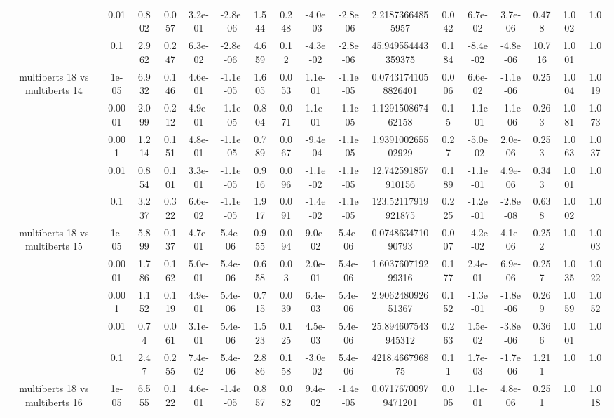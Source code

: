 \begin{tabular}{|c|c|c|c|c|c|c|c|c|c|c|c|c|c|c|c|c|}
 & 0.01 & 0.802 & 0.057 & 3.2e-01 & -2.8e-06 & 1.544 & 0.248 & -4.0e-03 & -2.8e-06 & 2.21873664855957 & 0.042 & 6.7e-02 & 3.7e-06 & 0.478 & 1.002 & 1.0 \\
 & 0.1 & 2.962 & 0.247 & 6.3e-02 & -2.8e-06 & 4.659 & 0.12 & -4.3e-02 & -2.8e-06 & 45.949554443359375 & 0.184 & -8.4e-02 & -4.8e-06 & 10.716 & 1.001 & 1.0 \\
\hline
\multirow{5}{*}{multiberts 18 vs multiberts 14} & 1e-05 & 6.932 & 0.146 & 4.6e-01 & -1.1e-05 & 1.605 & 0.053 & 1.1e-01 & -1.1e-05 & 0.07431741058826401 & 0.006 & 6.6e-02 & -1.1e-06 & 0.25 & 1.004 & 1.019 \\
 & 0.0001 & 2.099 & 0.212 & 4.9e-01 & -1.1e-05 & 0.804 & 0.071 & 1.1e-01 & -1.1e-05 & 1.129150867462158 & 0.15 & -1.1e-01 & -1.1e-06 & 0.263 & 1.081 & 1.073 \\
 & 0.001 & 1.214 & 0.151 & 4.8e-01 & -1.1e-05 & 0.789 & 0.067 & -9.4e-04 & -1.1e-05 & 1.939100265502929 & 0.27 & -5.0e-02 & 2.0e-06 & 0.253 & 1.063 & 1.037 \\
 & 0.01 & 0.854 & 0.101 & 3.3e-01 & -1.1e-05 & 0.916 & 0.096 & -1.1e-02 & -1.1e-05 & 12.742591857910156 & 0.189 & -1.1e-01 & 4.9e-06 & 0.343 & 1.001 & 1.0 \\
 & 0.1 & 3.237 & 0.322 & 6.6e-02 & -1.1e-05 & 1.917 & 0.091 & -1.4e-02 & -1.1e-05 & 123.52117919921875 & 0.225 & -1.2e-01 & -2.8e-08 & 0.638 & 1.002 & 1.0 \\
\hline
\multirow{5}{*}{multiberts 18 vs multiberts 15} & 1e-05 & 5.899 & 0.137 & 4.7e-01 & 5.4e-06 & 0.955 & 0.094 & 9.0e-02 & 5.4e-06 & 0.074863471090793 & 0.007 & -4.2e-02 & 4.1e-06 & 0.252 & 1.0 & 1.003 \\
 & 0.0001 & 1.786 & 0.162 & 5.0e-01 & 5.4e-06 & 0.658 & 0.03 & 2.0e-01 & 5.4e-06 & 1.603760719299316 & 0.177 & 2.4e-01 & 6.9e-06 & 0.257 & 1.035 & 1.022 \\
 & 0.001 & 1.152 & 0.119 & 4.9e-01 & 5.4e-06 & 0.715 & 0.039 & 6.4e-03 & 5.4e-06 & 2.906248092651367 & 0.152 & -1.3e-01 & -1.8e-06 & 0.269 & 1.059 & 1.052 \\
 & 0.01 & 0.74 & 0.061 & 3.1e-01 & 5.4e-06 & 1.523 & 0.125 & 4.5e-03 & 5.4e-06 & 25.894607543945312 & 0.263 & 1.5e-02 & -3.8e-06 & 0.366 & 1.001 & 1.0 \\
 & 0.1 & 2.47 & 0.255 & 7.4e-02 & 5.4e-06 & 2.886 & 0.158 & -3.0e-02 & 5.4e-06 & 4218.466796875 & 0.11 & 1.7e-03 & -1.7e-06 & 1.211 & 1.0 & 1.0 \\
\hline
\multirow{5}{*}{multiberts 18 vs multiberts 16} & 1e-05 & 6.555 & 0.122 & 4.6e-01 & -1.4e-05 & 0.857 & 0.082 & 9.4e-02 & -1.4e-05 & 0.07176700979471201 & 0.005 & 1.1e-01 & 4.8e-06 & 0.251 & 1.0 & 1.018 \\

\end{tabular}
